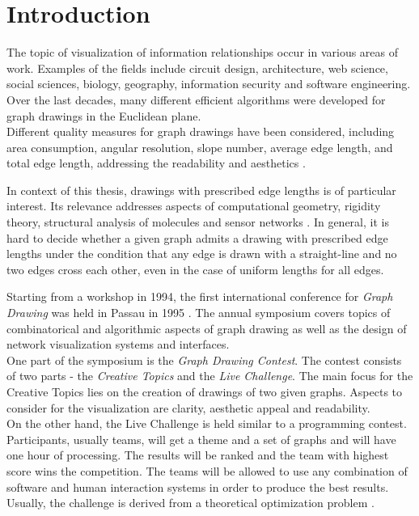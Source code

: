 \section{Introduction}

The topic of visualization of information relationships occur in various areas of work. Examples of the fields include circuit design, architecture, web science, social sciences, biology, geography, information security and software engineering.
Over the last decades, many different efficient algorithms were developed for graph drawings in the Euclidean plane.\\
Different quality measures for graph drawings have been considered, including area consumption, angular resolution, slope number, average edge length, and total edge length, addressing the readability and aesthetics \cite{edge-length-ratio-2tree}.

\bigskip
In context of this thesis, drawings with prescribed edge lengths is of particular interest. Its relevance addresses aspects of computational geometry, rigidity theory, structural analysis of molecules and sensor networks \cite[P. 1]{straight-line_2-trees}. In general, it is hard to decide \cite[P. 2]{straight-line_2-trees} whether a given graph admits a drawing with prescribed edge lengths under the condition that any edge is drawn with a straight-line and no two edges cross each other, even in the case of uniform lengths for all edges.

\bigskip


Starting from a workshop in 1994, the first international conference for \emph{Graph Drawing} was held in Passau in 1995 \cite{GD:Symposium}. The annual symposium covers topics of combinatorical and algorithmic aspects of graph drawing as well as the design of network visualization systems and interfaces.\\
One part of the symposium is the \emph{Graph Drawing Contest}. The contest consists of two parts - the \emph{Creative Topics} and the \emph{Live Challenge}. The main focus for the Creative Topics lies on the creation of drawings of two given graphs. Aspects to consider for the visualization are clarity, aesthetic appeal and readability.\\
On the other hand, the Live Challenge is held similar to a programming contest. Participants, usually teams, will get a theme and a set of graphs and will have one hour of processing. The results will be ranked and the team with highest score wins the competition. The teams will be allowed to use any combination of software and human interaction systems in order to produce the best results. Usually, the challenge is derived from a theoretical optimization problem \cite{GD:2021}.

